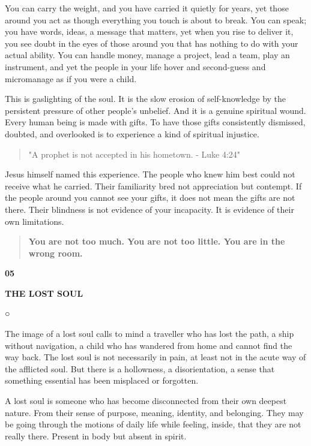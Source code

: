 You can carry the weight, and you have carried it quietly for years, yet
those around you act as though everything you touch is about to break.
You can speak; you have words, ideas, a message that matters, yet when
you rise to deliver it, you see doubt in the eyes of those around you
that has nothing to do with your actual ability. You can handle money,
manage a project, lead a team, play an instrument, and yet the people in
your life hover and second-guess and micromanage as if you were a child.

This is gaslighting of the soul. It is the slow erosion of
self-knowledge by the persistent pressure of other people's unbelief.
And it is a genuine spiritual wound. Every human being is made with
gifts. To have those gifts consistently dismissed, doubted, and
overlooked is to experience a kind of spiritual injustice.

\begin{quote}
"A prophet is not accepted in his hometown. - Luke 4:24"
\end{quote}

Jesus himself named this experience. The people who knew him best could
not receive what he carried. Their familiarity bred not appreciation but
contempt. If the people around you cannot see your gifts, it does not
mean the gifts are not there. Their blindness is not evidence of your
incapacity. It is evidence of their own limitations.

\begin{quote}
\textbf{You are not too much. You are not too little. You are in the
wrong room.}
\end{quote}

\textbf{05}

\textbf{THE LOST SOUL}

○

The image of a lost soul calls to mind a traveller who has lost the
path, a ship without navigation, a child who has wandered from home and
cannot find the way back. The lost soul is not necessarily in pain, at
least not in the acute way of the afflicted soul. But there is a
hollowness, a disorientation, a sense that something essential has been
misplaced or forgotten.

A lost soul is someone who has become disconnected from their own
deepest nature. From their sense of purpose, meaning, identity, and
belonging. They may be going through the motions of daily life while
feeling, inside, that they are not really there. Present in body but
absent in spirit.

